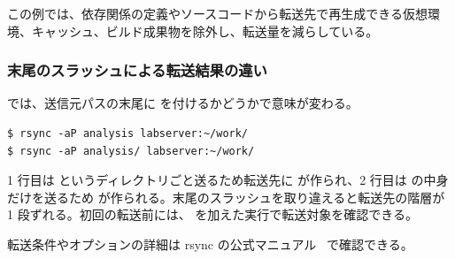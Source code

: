 この例では、依存関係の定義やソースコードから転送先で再生成できる仮想環境、キャッシュ、ビルド成果物を除外し、転送量を減らしている。

\subsubsection{末尾のスラッシュによる転送結果の違い}

 では、送信元パスの末尾に \code{/} を付けるかどうかで意味が変わる。

\begin{lstlisting}[numbers=none, xleftmargin=2\zw]
$ rsync -aP analysis labserver:~/work/
$ rsync -aP analysis/ labserver:~/work/
\end{lstlisting}

1 行目は  というディレクトリごと送るため転送先に  が作られ、2 行目は  の中身だけを送るため  が作られる。末尾のスラッシュを取り違えると転送先の階層が 1 段ずれる。初回の転送前には、 を加えた実行で転送対象を確認できる。

転送条件やオプションの詳細は rsync の公式マニュアル~\cite{rsync_manual} で確認できる。
